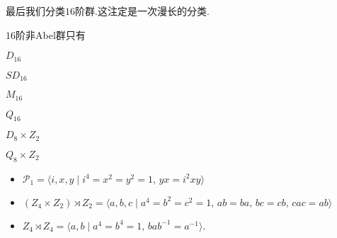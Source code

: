 最后我们分类$16$阶群.这注定是一次漫长的分类.
\begin{prop}
	$16$阶非Abel群只有\par
	\begin{itemize*}
		\item $D_{16}$\phantom{\qquad}
		\item $SD_{16}$\phantom{\qquad}
		\item $M_{16}$\phantom{\qquad}
		\item $Q_{16}$\phantom{\qquad}
		\item $D_{8}\times Z_2$\phantom{\qquad}
		\item $Q_8\times Z_2$\phantom{\qquad}
	\end{itemize*}
	\begin{itemize}
		\item $\mathcal{P}_1=\langle i,x,y\mid i^4=x^2=y^2=1,\,yx=i^2xy\rangle$
		\item $(Z_4\times Z_2)\rtimes Z_2=\langle a,b,c\mid a^4=b^2=c^2=1,\,ab=ba,\,bc=cb,\,cac=ab\rangle $
		\item $Z_4\rtimes Z_4=\langle a,b\mid a^4=b^4=1,\,bab^{-1}=a^{-1}\rangle $.
	\end{itemize}
\end{prop}
